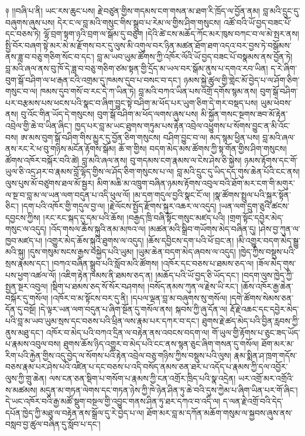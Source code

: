 \documentclass{article}
\begin{document}
༈ །།བཞི་པ་ནི། ཡང་རས་ཆུང་པས། རྗེ་བཙུན་གྱིས་གདམས་ངག་གསན་མ་ཐག་རི་ཁྲོད་ལ་བྱོན་ནམ། བླ་མའི་དྲུང་དུ་བཞུགས་ཞུས་པས། དེར་ང་ལ་བླ་མའི་གསུང་གིས་སྒྲུབ་པ་རེམ་ལ་གྱིས་ཤིག་གསུངས། འཚོ་བའི་ཡོ་བྱད་བཟང་པོ་དང་བཅས་ཏེ། ལྷོ་བྲག་སྟག་ཉའི་བྲག་ལ་སྒོམ་དུ་བཅུག །དེའི་ཚེ་ངས་མཆོད་ཀོང་མར་ཁུས་བཀང་བ་ལ་མེ་སྤར་ནས། སྤྱི་བོར་བཞག་སྟེ་མར་མེ་མ་རྫོགས་བར་དུ་ལུས་མི་འགུལ་བར་ཉིན་མཚན་ཐོག་ཐག་འདའ་བར་བྱས་ཏེ་བསྒོམས་ནས་ཟླ་བ་བཅུ་གཅིག་སོང་བ་དང་། བླ་མ་ཡབ་ཡུམ་ཚོགས་ཀྱི་འཁོར་ལོའི་ཡོ་བྱད་བཟང་པོ་བསྣམས་ནས་བྱོན་ཏེ། བླ་མའི་ཞལ་ནས་བུ་ཁོ་དེ་ཟླ་བ་བཅུ་གཅིག་ཙམ་སྟན་གྱི་དྲོད་མ་ཡལ་བར་སྒོམ་ནུས་པ་དགའ་རབ་ཡིན། ད་རེ་ཞིག་བུག་སྒོ་བཤིག་ལ་ཕ་རྒན་ངའི་འགྲམ་དུ་ཁམས་དུབ་པ་བསང་བ་དང་། ཉམས་སྐྱེ་ཚུལ་གྱི་གླེང་མོ་བྱེད་པ་ལ་ཤོག་ཅིག་གསུང་བ་ལ། ཁམས་དུབ་གསོ་བ་རང་དེ་ཀ་ཡིན་ཏེ། བླ་མའི་བཀའ་ཡིན་པས་འགྲོ་དགོས་སྙམ་ནས། བུག་སྒོ་བཤིག་པར་བརྩམས་པས་ཕངས་པའི་སྣང་བ་ཞིག་བྱུང་སྟེ་བཤིག་མ་ཕོད་པར་ཡུག་ཅིག་དེ་གར་བསྡད་པས། ཡུམ་ཕེབས་ནས། བུ་འོང་གིན་ཡོད་དེ་གསུངས། བུག་སྒོ་བཤིག་མ་ཕོད་ལགས་ཞུས་པས། མི་སྐྱོན་གསང་སྔགས་ཟབ་མོ་རྟེན་འབྲེལ་གྱི་ཆེ་བ་ཡིན་ཞིང་། ཁྱད་པར་བླ་མ་ཡང་ཐུགས་གཏུམ་པས་རྟེན་འབྲེལ་འཕྱུགས་པ་སོགས་བྱུང་ན་མི་འོང་བས། ཨ་མས་བུག་སྒོ་བཤིག་གིས་མྱུར་དུ་བྱོན་ཅིག་གསུངས། བཤིག་བྱུང་བ་ལ། མད་སྙམ་ཕྱིན་པས། བླ་མའི་ཞལ་ནས་རང་རེ་ཕ་བུ་གཉིས་མངོན་རྟོགས་སྒོམ། ཆོ་ག་གྱིས། བདག་མེད་མས་ཚོགས་ཀྱི་སྟ་གོན་གྱིས་ཤིག་གསུངས། ཚོགས་འཁོར་བསྐོར་བའི་ཚེ། བླ་མའི་ཞལ་ནས། བུ་གདམས་ངག་རྣམས་ལ་ངེས་ཤེས་ཅི་སྐྱེས། ཉམས་རྟོགས་དང་གོ་ཡུལ་ཅི་འདྲ་ཤར་བ་རྣམས་བློ་ལྷོད་གྱིས་ལ་ཤོད་ཅིག་གསུངས་པ་ལ། བླ་མའི་དྲུང་དུ་ཡིད་དད་གུས་ཆེན་པོའི་ངང་ནས། ལུས་པུས་མོ་བཙུགས་ཐལ་མོ་སྦྱར། མིག་མཆི་མ་འཁྲུག་བཞིན་ཉམས་རྟོགས་འབུལ་བའི་ཐོག་མར་ངག་གི་མགུར་ལ་སྔ་བ་བླ་མ་ལ་ཡན་ལག་བདུན་པ་འདི་ཕུལ་ལོ། །མ་དག་གདུལ་བྱའི་སྣང་ངོ་ལ། །སྣ་ཚོགས་སྤྲུལ་པའི་སྐུར་སྟོན་ཅིང་། །དག་པའི་འཁོར་གྱི་གདུལ་བྱ་ལ། །རྗེ་ལོངས་སྤྱོད་རྫོགས་སྐུར་འཆར་ལ་འདུད། །ཡན་ལག་དྲུག་ཅུའི་ཚངས་དབྱངས་ཀྱིས། །རང་རང་སྐད་དུ་དམ་པའི་ཆོས། །བརྒྱད་ཁྲི་བཞི་སྟོང་གསུང་མཛད་པའི། །གྲག་སྟོང་དབྱེར་མེད་གསུང་ལ་འདུད། །འོད་གསལ་ཆོས་སྐུའི་ནམ་མཁའ་ལ། །མཚན་མའི་སྒྲིབ་གཡོགས་མེད་བཞིན་དུ། །ཤེས་བྱ་ཀུན་ལ་ཁྱབ་མཛད་པ། །འགྱུར་མེད་ཆོས་སྐུའི་ཐུགས་ལ་འདུད། །ཆོས་དབྱིངས་དག་པའི་ཕོ་བྲང་ན། །མི་འགྱུར་བདག་མེད་སྒྱུ་མའི་སྐུ། །དུས་གསུམ་སངས་རྒྱས་བསྐྱེད་པའི་ཡུམ། །ཡུམ་ཆེན་བདག་མེད་ཞབས་ལ་འདུད། །ཁྱེད་ཀྱིས་བསྡུས་པའི་སྲས་རྣམས་དང་། །བཀའ་བཞིན་སྒྲུབ་པའི་སློབ་མའི་ཚོགས། །འཁོར་དང་བཅས་པ་ཐམས་ཅད་ལ། །ཟོལ་མེད་གུས་པས་ཕྱག་འཚལ་ལོ། །འཇིག་རྟེན་ཁམས་ནི་ཐམས་ཅད་ན། །མཆོད་པའི་ཡོ་བྱད་ཅི་ཡོད་དང་། །བདག་ལུས་ཁྱེད་ཀྱི་སྤྱན་སྔར་འབུལ། །སྡིག་པ་ཐམས་ཅད་སོ་སོར་བཤགས། །བསོད་ནམས་ཀུན་ལ་རྗེས་ཡི་རང་། །ཆོས་འཁོར་རྒྱ་ཆེན་བསྐོར་དུ་གསོལ། །འཁོར་བ་མ་སྟོངས་བར་དུ་ནི། །དཔལ་ལྡན་བླ་མ་བཞུགས་སུ་གསོལ། །དགེ་ཚོགས་སེམས་ཅན་དོན་དུ་བསྔོ། །དེ་ལྟར་ཡན་ལག་བདུན་པ་ཞིག་སྔོན་དུ་གསོལ་ནས། སྐབས་ཀྱི་ཞུ་དོན་ལ། རྡོ་རྗེ་འཆང་དང་དབྱེར་མེད་པའི་བླ་མ་ཡབ་ཡུམ་སྲས་དང་བཅས་པའི་ཕྲིན་ལས་རྣམ་པར་དཀར་བ་དང་། ཐུགས་རྗེ་ཚད་མེད་པའི་བྱིན་རླབས་ཀྱི་ནུས་མཐུ་དང་། འཁོར་བ་མེད་པའི་བཀའ་དྲིན་ལ་བརྟེན་ནས་འབངས་བདག་ལ། གོ་ཡུལ་གྱི་རྟོགས་པ་ཅུང་ཟད་ཡོད་པ་རྣམས་འབུལ་བས། ཐུགས་ཆོས་ཉིད་འགྱུར་བ་མེད་པའི་ངང་ནས་སྙན་ཅུང་ཞིག་གསན་དུ་གསོལ། ཐོག་མར་མ་རིག་པའི་རྐྱེན་གྱིས་འདུ་བྱེད་ལ་སོགས་པའི་རྟེན་འབྲེལ་བཅུ་གཉིས་ཀྱིས་བསྡུས་པའི་ལུས། རྣམ་སྨིན་ཤ་ཁྲག་གདོས་བཅས་རྣམ་པར་ཤེས་པའི་འཛིན་པ་དང་བཅས་པ་འདི་བསོད་ནམས་ཅན་ཐར་པ་འདོད་པ་རྣམས་ཀྱི་དལ་འབྱོར་ལུས་ཀྱི་གྲུ་ཆེན། ལས་ངན་ཅན་སྡིག་པ་གསོག་པ་རྣམས་ཀྱི་ངན་འགྲོར་ཁྲིད་པའི་སྣ་འདྲེན། ཡར་འགྲོ་མར་འགྲོའི་ས་མཚམས། མདུན་མ་གཏན་ལེགས་དང་གཏན་ཉེས་ཀྱི་ཁེ་ཉེན་ཤིན་ཏུ་ཆེ་བའི་དུས་ཀྱེམ་པ་ཞིག་ཡིན་པར་གོ་ཞིང་། དེ་ཡང་འཁོར་བའི་རྒྱ་མཚོ་སྡུག་བསྔལ་གྱི་འབྱུང་གནས་ཤིན་ཏུ་ཐར་དཀའ་བ་འདི་ལ། ད་ལན་རྗེ་འགྲོ་བའི་དེད་དཔོན་ཁྱེད་ཀྱི་མཐུ་ལ་བརྟེན་ནས་སྒྲོལ་དུ་རེ་བྱེད་པ་ལ། ཐོག་མར་བླ་མ་དཀོན་མཆོག་གསུམ་ལ་སྐྱབས་ཞུས་ནས་བསླབ་བྱ་ཚུལ་བཞིན་དུ་སློབ་པ་དང་། 
\end{document}
